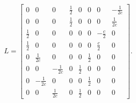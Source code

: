 \documentclass[11pt, reqno]{amsart}
\theoremstyle{definition}
\begin{document}
\begin{align}
  L
  =
  \left[
    \begin{matrix}
      0 & 0 & 0 & \frac{1}{2} & 0 & 0 & 0 & -\frac{1}{2c} \\
      0 & 0 & 0 & \frac{1}{2} & 0 & 0 & 0 & \frac{1}{2c} \\
      \frac{1}{2} & 0 & 0 & 0 & 0 & 0 & -\frac{c}{2} & 0 \\
      \frac{1}{2} & 0 & 0 & 0 & 0 & 0 & \frac{c}{2} & 0 \\
      0 & \frac{1}{2c} & 0 & 0 & 0 & \frac{1}{2} & 0 & 0 \\
      0 & 0 & -\frac{1}{2c} & 0 & \frac{1}{2} & 0 & 0 & 0 \\
      0 & -\frac{1}{2c} & 0 & 0 & 0 & \frac{1}{2} & 0 & 0 \\
      0 & 0 & \frac{1}{2c} & 0 & \frac{1}{2} & 0 & 0 & 0
    \end{matrix}
  \right].
  \label{eq:ph_lev}
\end{align}



\end{document}
